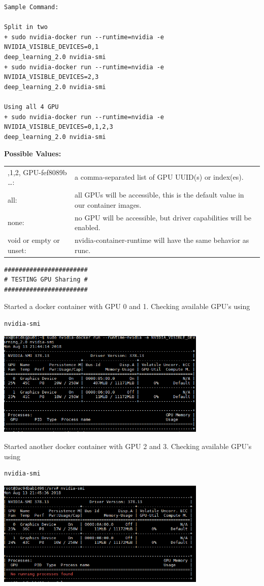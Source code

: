 \documentclass[a4paper]{article}
\begin{document}
\begin{verbatim}
Sample Command:

Split in two 
+ sudo nvidia-docker run --runtime=nvidia -e NVIDIA_VISIBLE_DEVICES=0,1
deep_learning_2.0 nvidia-smi
+ sudo nvidia-docker run --runtime=nvidia -e NVIDIA_VISIBLE_DEVICES=2,3 
deep_learning_2.0 nvidia-smi

Using all 4 GPU
+ sudo nvidia-docker run --runtime=nvidia -e NVIDIA_VISIBLE_DEVICES=0,1,2,3
deep_learning_2.0 nvidia-smi
\end{verbatim}




\vspace{45pt}
\textbf{Possible Values:}
\vspace{5pt}

\begin{tabular} { >{\ttfamily}l  p{6.5cm} }
0,1,2, GPU-fef8089b …: 		&	a comma-separated list of GPU UUID(s) or index(es).\\
all: 						&	all GPUs will be accessible, this is the default value in our container images.\\
none: 						&	no GPU will be accessible, but driver capabilities will be enabled.\\
void or empty or unset: 	&	nvidia-container-runtime will have the same behavior as runc.\\
\end{tabular}


\raggedright
\begin{verbatim}
#######################
# TESTING GPU Sharing #
#######################
\end{verbatim}
Started a docker container with GPU 0 and 1. Checking available GPU's using 
\begin{verbatim}
nvidia-smi
\end{verbatim}
\centering
\includegraphics[width=10cm, height=5cm]{./images/gpu_0.PNG}

\raggedright
Started another docker container with GPU 2 and 3. Checking available GPU's using 
\begin{verbatim}
nvidia-smi
\end{verbatim}
\centering
\includegraphics[width=10cm, height=5cm]{./images/gpu_1.PNG}
\end{document}
